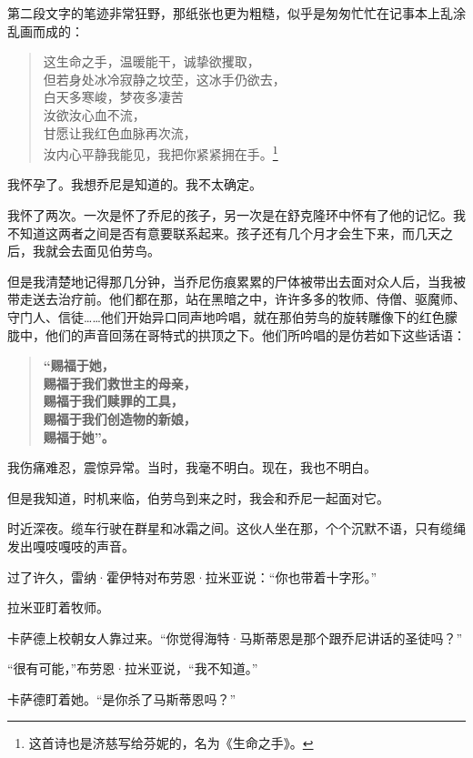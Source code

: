 \documentclass[AutoFakeBold=true]{book}
\begin{document}
第二段文字的笔迹非常狂野，那纸张也更为粗糙，似乎是匆匆忙忙在记事本上乱涂乱画而成的：

\begin{quote}
	{\kaishu 这生命之手，温暖能干，诚挚欲攫取，\\
	但若身处冰冷寂静之坟茔，这冰手仍欲去，\\
	白天多寒峻，梦夜多凄苦\\
	汝欲汝心血不流，\\
	甘愿让我红色血脉再次流，\\
	汝内心平静我能见，我把你紧紧拥在手。}\footnote{这首诗也是济慈写给芬妮的，名为《生命之手》。}
\end{quote}

我怀孕了。我想乔尼是知道的。我不太确定。

我怀了两次。一次是怀了乔尼的孩子，另一次是在舒克隆环中怀有了他的记忆。我不知道这两者之间是否有意要联系起来。孩子还有几个月才会生下来，而几天之后，我就会去面见伯劳鸟。

但是我清楚地记得那几分钟，当乔尼伤痕累累的尸体被带出去面对众人后，当我被带走送去治疗前。他们都在那，站在黑暗之中，许许多多的牧师、侍僧、驱魔师、守门人、信徒……他们开始异口同声地吟唱，就在那伯劳鸟的旋转雕像下的红色朦胧中，他们的声音回荡在哥特式的拱顶之下。他们所吟唱的是仿若如下这些话语：

\begin{quote}
	{\bf \kaishu ``赐福于她，\\
	赐福于我们救世主的母亲，\\
	赐福于我们赎罪的工具，\\
	赐福于我们创造物的新娘，\\
	赐福于她''。}
\end{quote}

我伤痛难忍，震惊异常。当时，我毫不明白。现在，我也不明白。

但是我知道，时机来临，伯劳鸟到来之时，我会和乔尼一起面对它。

\vspace*{1em}

时近深夜。缆车行驶在群星和冰霜之间。这伙人坐在那，个个沉默不语，只有缆绳发出嘎吱嘎吱的声音。

过了许久，雷纳·霍伊特对布劳恩·拉米亚说：``你也带着十字形。''

拉米亚盯着牧师。

卡萨德上校朝女人靠过来。``你觉得海特·马斯蒂恩是那个跟乔尼讲话的圣徒吗？''

``很有可能，''布劳恩·拉米亚说，``我不知道。''

卡萨德盯着她。``是你杀了马斯蒂恩吗？''
\end{document}
